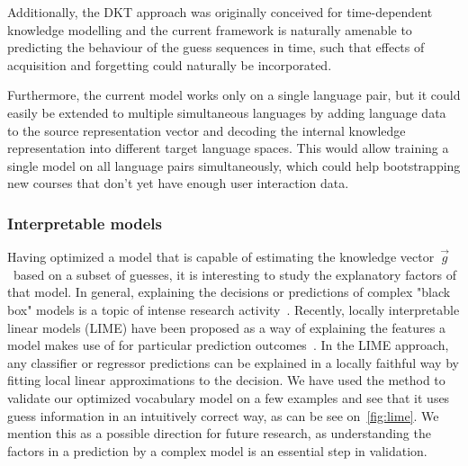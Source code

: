 Additionally, the DKT approach was originally conceived for time-dependent knowledge modelling and the current framework is naturally amenable to predicting the behaviour of the guess sequences in time, such that effects of acquisition and forgetting could naturally be incorporated.

Furthermore, the current model works only on a single language pair, but it could easily be extended to multiple simultaneous languages by adding language data to the source representation vector and decoding the internal knowledge representation into different target language spaces. This would allow training a single model on all language pairs simultaneously, which could help bootstrapping new courses that don't yet have enough user interaction data. 

\subsubsection{Interpretable models}
Having optimized a model that is capable of estimating the knowledge vector~$\vec{g}$~based on a subset of guesses, it is interesting to study the explanatory factors of that model. In general, explaining the decisions or predictions of complex "black box" models is a topic of intense research activity~\cite{2017arXiv170808296S}. Recently, locally interpretable linear models (LIME) have been proposed as a way of explaining the features a model makes use of for particular prediction outcomes~\cite{ribeiro2016should}. In the LIME approach, any classifier or regressor predictions can be explained in a locally faithful way by fitting local linear approximations to the decision. We have used the method to validate our optimized vocabulary model on a few examples and see that it uses guess information in an intuitively correct way, as can be see on~\cref{fig:lime}. We mention this as a possible direction for future research, as understanding the factors in a prediction by a complex model is an essential step in validation.

